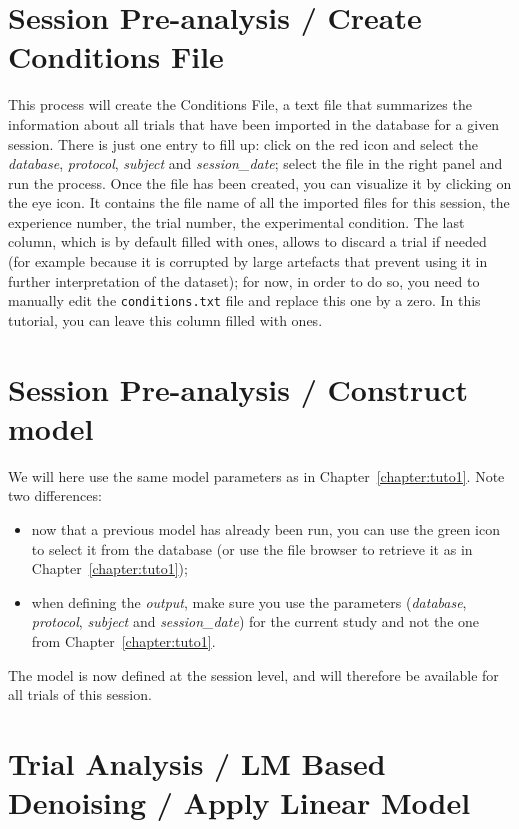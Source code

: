 \section{Session Pre-analysis / Create Conditions File}

This process will create the Conditions File, a text file that summarizes the information about all trials that have been imported in the database for a given session.
There is just one entry to fill up: click on the red icon and select the \textit{database}, \textit{protocol}, \textit{subject} and \textit{session\_date}; select the file in the right panel and run the process.
Once the file has been created, you can visualize it by clicking on the eye icon. It contains the file name of all the imported files for this session, the experience number, the trial number, the experimental condition.
The last column, which is by default filled with ones, allows to discard a trial if needed (for example because it is corrupted by large artefacts that prevent using it in further interpretation of the dataset); for now, in order to do so, you need to manually edit the \texttt{conditions.txt} file and replace this one by a zero.  In this tutorial, you can leave this column filled with ones.



\section{Session Pre-analysis / Construct model}

We will here use the same model parameters as in Chapter~\ref{chapter:tuto1}. Note two differences:

\begin{itemize}
  \item now that a previous model has already been run, you can use the green icon to select it from the database (or use the file browser to retrieve it as in Chapter~\ref{chapter:tuto1});
  \item when defining the \textit{output}, make sure you use the parameters (\textit{database}, \textit{protocol}, \textit{subject} and \textit{session\_date}) for the current study and not the one from Chapter~\ref{chapter:tuto1}.
\end{itemize}

The model is now defined at the session level, and will therefore be available for all trials of this session.


\section{Trial Analysis / LM Based Denoising / Apply Linear Model}

